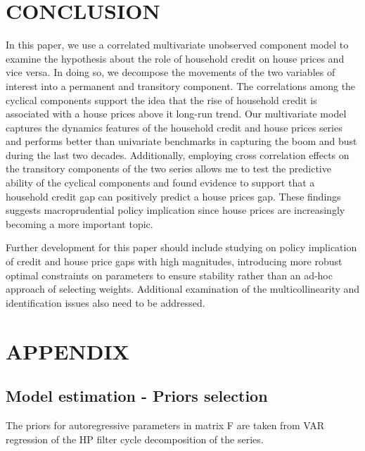 \documentclass[
  12pt,
]{article}
\begin{document}
\hypertarget{conclusion}{%
\section{CONCLUSION}\label{conclusion}}

In this paper, we use a correlated multivariate unobserved component model to examine the hypothesis about the role of household credit on house prices and vice versa. In doing so, we decompose the movements of the two variables of interest into a permanent and transitory component. The correlations among the cyclical components support the idea that the rise of household credit is associated with a house prices above it long-run trend. Our multivariate model captures the dynamics features of the household credit and house prices series and performs better than univariate benchmarks in capturing the boom and bust during the last two decades. Additionally, employing cross correlation effects on the transitory components of the two series allows me to test the predictive ability of the cyclical components and found evidence to support that a household credit gap can positively predict a house prices gap. These findings suggests macroprudential policy implication since house prices are increasingly becoming a more important topic.

Further development for this paper should include studying on policy implication of credit and house price gaps with high magnitudes, introducing more robust optimal constraints on parameters to ensure stability rather than an ad-hoc approach of selecting weights. Additional examination of the multicollinearity and identification issues also need to be addressed.

\hypertarget{appendix}{%
\section*{APPENDIX}\label{appendix}}

\hypertarget{model-estimation---priors-selection}{%
\subsection*{Model estimation - Priors selection}\label{model-estimation---priors-selection}}

The priors for autoregressive parameters in matrix F are taken from VAR regression of the HP filter cycle decomposition of the series.
\end{document}
